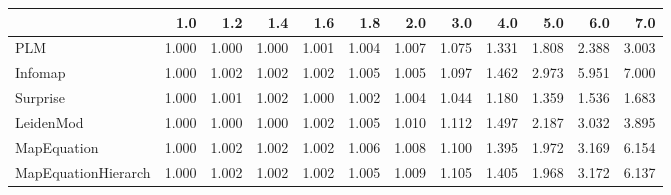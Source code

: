 \begin{tabular}{lrrrrrrrrrrr}
\toprule
{} &   1.0 &   1.2 &   1.4 &   1.6 &   1.8 &   2.0 &   3.0 &   4.0 &   5.0 &   6.0 &   7.0 \\
\midrule
PLM                 & 1.000 & 1.000 & 1.000 & 1.001 & 1.004 & 1.007 & 1.075 & 1.331 & 1.808 & 2.388 & 3.003 \\
Infomap             & 1.000 & 1.002 & 1.002 & 1.002 & 1.005 & 1.005 & 1.097 & 1.462 & 2.973 & 5.951 & 7.000 \\
Surprise            & 1.000 & 1.001 & 1.002 & 1.000 & 1.002 & 1.004 & 1.044 & 1.180 & 1.359 & 1.536 & 1.683 \\
LeidenMod           & 1.000 & 1.000 & 1.000 & 1.002 & 1.005 & 1.010 & 1.112 & 1.497 & 2.187 & 3.032 & 3.895 \\
MapEquation         & 1.000 & 1.002 & 1.002 & 1.002 & 1.006 & 1.008 & 1.100 & 1.395 & 1.972 & 3.169 & 6.154 \\
MapEquationHierarch & 1.000 & 1.002 & 1.002 & 1.002 & 1.005 & 1.009 & 1.105 & 1.405 & 1.968 & 3.172 & 6.137 \\
\bottomrule
\end{tabular}

